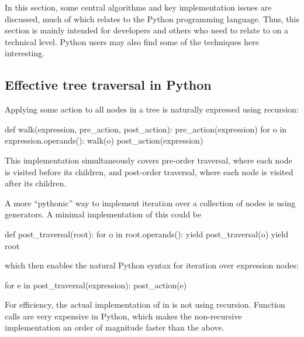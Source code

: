 In this section, some central algorithms and key implementation issues
are discussed, much of which relates to the Python programming
language.  Thus, this section is mainly intended for developers and
others who need to relate to \ufl{} on a technical level.
Python users may also find some of the techniques here interesting.

\subsection{Effective tree traversal in Python}
\label{ufl:sec:traversal}


Applying some action to all nodes in a tree is naturally expressed
using recursion:
\begin{python}
def walk(expression, pre_action, post_action):
    pre_action(expression)
    for o in expression.operands():
        walk(o)
    post_action(expression)
\end{python}
This implementation simultaneously covers pre-order traversal, where
each node is visited before its children, and post-order traversal,
where each node is visited after its children.

A more ``pythonic'' way to implement iteration over a collection of
nodes is using generators.  A minimal implementation of this could be
\begin{python}
def post_traversal(root):
    for o in root.operands():
        yield post_traversal(o)
    yield root
\end{python}
which then enables the natural Python syntax for iteration over expression nodes:
\begin{python}
for e in post_traversal(expression):
    post_action(e)
\end{python}
For efficiency, the actual implementation of 
in \ufl{} is not using recursion.  Function calls are very expensive
in Python, which makes the non-recursive implementation an order of
magnitude faster than the above.

